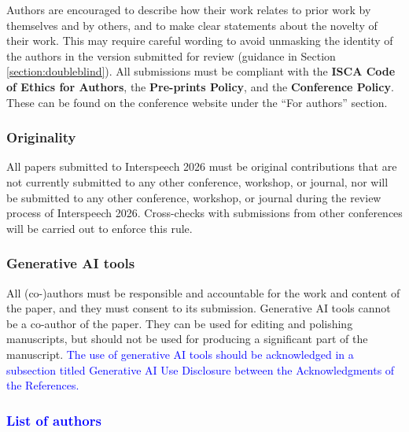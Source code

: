 \documentclass[cameraready]{Interspeech}
\newcommand{\blue}[1]{\textcolor{blue}{#1}}
\begin{document}
Authors are encouraged to describe how their work relates to prior work by themselves and by others, and to make clear statements about the novelty of their work. This may require careful wording to avoid unmasking the identity of the authors in the version submitted for review (guidance in Section \ref{section:doubleblind}). All submissions must be compliant with the \textbf{ISCA Code of Ethics for Authors}, the \textbf{Pre-prints Policy}, and the \textbf{Conference Policy}. These can be found on the conference website under the ``For authors'' section.

\subsubsection{Originality}

All papers submitted to Interspeech 2026 must be original contributions that are not currently submitted to any other conference, workshop, or journal, nor will be submitted to any other conference, workshop, or journal during the review process of Interspeech 2026. Cross-checks with submissions from other conferences will be carried out to enforce this rule.

\subsubsection{Generative AI tools}

All (co-)authors must be responsible and accountable for the work and content of the paper, and they must consent to its submission. Generative AI tools cannot be a co-author of the paper. They can be used for editing and polishing manuscripts, but should not be used for producing a significant part of the manuscript.
\blue{The use of generative AI tools should be acknowledged in a subsection titled Generative AI Use Disclosure between the Acknowledgments of the References.}






\subsubsection{\blue{List of authors}}
\end{document}
